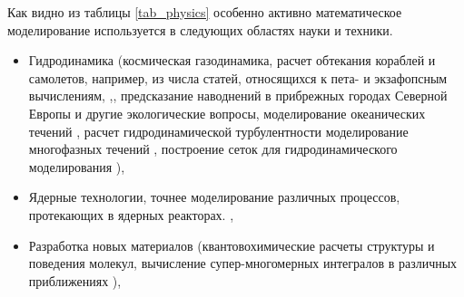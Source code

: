 Как видно из таблицы \ref{tab_physics} особенно активно математическое моделирование используется в следующих областях науки и техники.  
\begin{itemize}
	\item Гидродинамика (космическая газодинамика, расчет обтекания кораблей и самолетов, например, из числа статей, относящихся к пета- и экзафопсным вычислениям, \cite{Onishi2014},\cite{Lu2015,Peterson1989}, предсказание наводнений в прибрежных городах Северной Европы и другие экологические вопросы, моделирование океанических течений \cite{STERN20151,Newman20152086,Reuter2015325,Walker2014287}, расчет гидродинамической турбулентности %
	\cite{Mininni2011316,Appeloe201019,Yokota2013445,Tucker2016,Kotov2016189}  моделирование многофазных течений \cite{Safi2016170,Zaspel2016505}, построение сеток для гидродинамического моделирования \cite{Shang2013381,Yilmaz2013388,Ono20142336,Yilmaz2013773}),
	\item Ядерные технологии, точнее моделирование различных процессов, протекающих в ядерных реакторах. \cite{Romano2013274,Romano201320,Romano201590,Boyd201443,Gong2012588,Gong20116010,Bergmann2015176,Bauge201432}, 
	\item Разработка новых материалов (квантовохимические расчеты структуры и поведения молекул, вычисление супер-многомерных интегралов в различных приближениях \cite{Ono2015}),%
	
\end{itemize}

